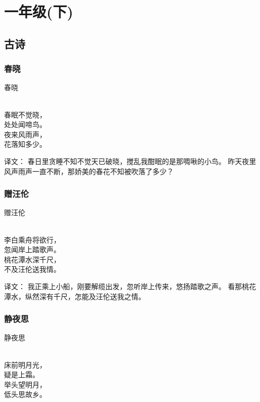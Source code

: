 \chapter{一年级(下)}
\section{古诗}
\subsection{春晓}
\begin{pinyinscope}
	\noindent \huge 春晓
	
	  \\
	
	\noindent 春眠不觉晓，\\处处闻啼鸟。\\
	夜来风雨声，\\花落知多少。
\end{pinyinscope}

译文：
春日里贪睡不知不觉天已破晓，搅乱我酣眠的是那啁啾的小鸟。
昨天夜里风声雨声一直不断，那娇美的春花不知被吹落了多少？

\subsection{赠汪伦}
\begin{pinyinscope}
	\noindent \huge 赠汪伦
	
	  \\
	
	\noindent 李白乘舟将欲行，\\忽闻岸上踏歌声。\\
	桃花潭水深千尺，\\不及汪伦送我情。
\end{pinyinscope}

译文：
我正乘上小船，刚要解缆出发，忽听岸上传来，悠扬踏歌之声。
看那桃花潭水，纵然深有千尺，怎能及汪伦送我之情。

\subsection{静夜思}
\begin{pinyinscope}
	\noindent \huge 静夜思
	
	  \\
	
	\noindent 床前明月光，\\疑是上霜。\\
	举头望明月，\\低头思故乡。
\end{pinyinscope}

